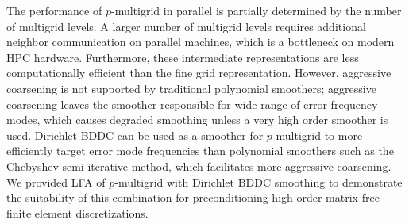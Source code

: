 The performance of $p$-multigrid in parallel is partially determined by the number of multigrid levels.
A larger number of multigrid levels requires additional neighbor communication on parallel machines, which is a bottleneck on modern HPC hardware.
Furthermore, these intermediate representations are less computationally efficient than the fine grid representation.
However, aggressive coarsening is not supported by traditional polynomial smoothers; aggressive coarsening leaves the smoother responsible for wide range of error frequency modes, which causes degraded smoothing unless a very high order smoother is used.
Dirichlet BDDC can be used as a smoother for $p$-multigrid to more efficiently target error mode frequencies than polynomial smoothers such as the Chebyshev semi-iterative method, which facilitates more aggressive coarsening.
We provided LFA of $p$-multigrid with Dirichlet BDDC smoothing to demonstrate the suitability of this combination for preconditioning high-order matrix-free finite element discretizations.